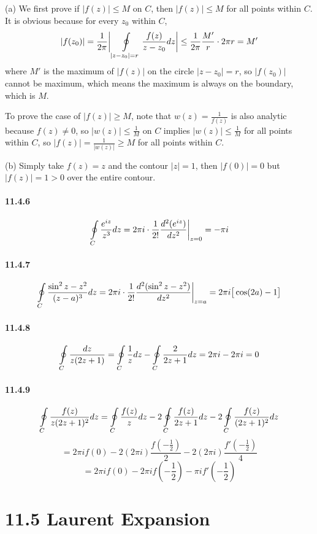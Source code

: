 \documentclass[a4paper]{article}
\begin{document}
(a)
We first prove if $|f(z)|\leq M$ on $C$, then $|f(z)|\leq M$ for all points within $C$. It is obvious because for every $z_0$ within $C$,
\[
|f(z_0)|=\frac{1}{2\pi}\bigg|\oint\displaylimits_{|z-z_0|=r}\frac{f(z)}{z-z_0}dz \bigg|\leq\frac{1}{2\pi}\frac{M'}{r}\cdot2\pi r=M'
\]
where $M'$ is the maximum of $|f(z)|$ on the circle $|z-z_0|=r$, so $|f(z_0)|$ cannot be maximum, which means the maximum is always on the boundary, which is $M$.

To prove the case of $|f(z)|\geq M$, note that $w(z)=\frac{1}{f(z)}$ is also analytic because $f(z)\neq0$, so $|w(z)|\leq\frac{1}{M}$ on $C$ implies $|w(z)|\leq\frac{1}{M}$ for all points within $C$, so $|f(z)|=\frac{1}{|w(z)|}\geq M$ for all points within $C$.

(b)
Simply take $f(z)=z$ and the contour $|z|=1$, then $|f(0)|=0$ but $|f(z)|=1>0$ over the entire contour.


\paragraph{11.4.6}
\[
\oint\displaylimits_C\frac{e^{iz}}{z^3}dz=2\pi i\cdot\frac{1}{2!}\frac{d^2(e^{iz})}{dz^2}\bigg|_{z=0}=-\pi i
\]

\paragraph{11.4.7}
\[
\oint\displaylimits_C\frac{\sin^2z-z^2}{(z-a)^3}dz=2\pi i\cdot\frac{1}{2!}\frac{d^2(\sin^2z-z^2)}{dz^2}\bigg|_{z=a}=2\pi i\big[\cos(2a)-1 \big]
\]

\paragraph{11.4.8}
\[
\oint\displaylimits_C\frac{dz}{z(2z+1)}=\oint\displaylimits_C\frac{1}{z}dz-\oint\displaylimits_C\frac{2}{2z+1}dz=2\pi i-2\pi i=0
\]

\paragraph{11.4.9}
\[
\oint\displaylimits_C\frac{f(z)}{z(2z+1)^2}dz=\oint\displaylimits_C\frac{f(z)}{z}dz-2\oint\displaylimits_C\frac{f(z)}{2z+1}dz-2\oint\displaylimits_C\frac{f(z)}{(2z+1)^2}dz
\]
\[
=2\pi if(0)-2(2\pi i)\frac{f(-\frac{1}{2})}{2}-2(2\pi i)\frac{f'(-\frac{1}{2})}{4}
\]
\[
=2\pi if(0)-2\pi if(-\frac{1}{2})-\pi if'(-\frac{1}{2})
\]

\section*{11.5 Laurent Expansion}
\end{document}
